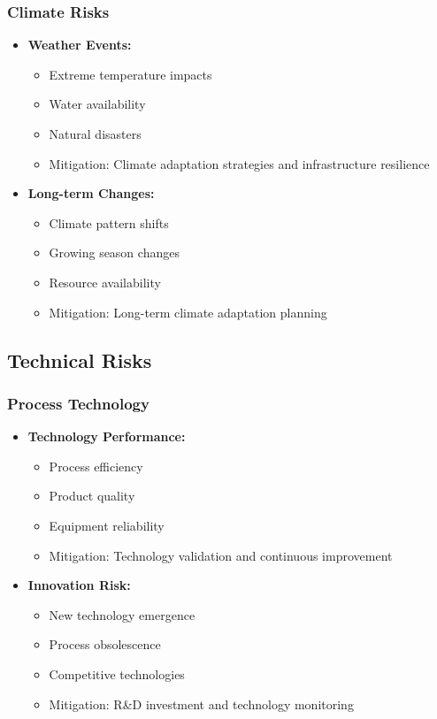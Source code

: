 \subsubsection{Climate Risks}
\begin{itemize}
    \item \textbf{Weather Events:}
    \begin{itemize}
        \item Extreme temperature impacts
        \item Water availability
        \item Natural disasters
        \item Mitigation: Climate adaptation strategies and infrastructure resilience
    \end{itemize}
    
    \item \textbf{Long-term Changes:}
    \begin{itemize}
        \item Climate pattern shifts
        \item Growing season changes
        \item Resource availability
        \item Mitigation: Long-term climate adaptation planning
    \end{itemize}
\end{itemize}

\subsection{Technical Risks}

\subsubsection{Process Technology}
\begin{itemize}
    \item \textbf{Technology Performance:}
    \begin{itemize}
        \item Process efficiency
        \item Product quality
        \item Equipment reliability
        \item Mitigation: Technology validation and continuous improvement
    \end{itemize}
    
    \item \textbf{Innovation Risk:}
    \begin{itemize}
        \item New technology emergence
        \item Process obsolescence
        \item Competitive technologies
        \item Mitigation: R\&D investment and technology monitoring
    \end{itemize}
\end{itemize}

